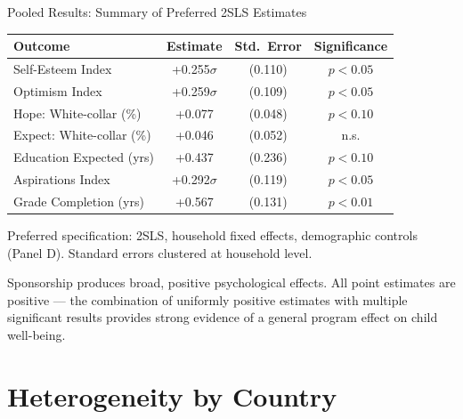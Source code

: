 \documentclass[aspectratio=169, 10pt]{beamer}
\begin{document}
\begin{frame}{Pooled Results: Summary of Preferred 2SLS Estimates}
  \begin{center}
  \small
  \begin{tabular}{lccc}
    \toprule
    \textbf{Outcome} & \textbf{Estimate} & \textbf{Std.\ Error} & \textbf{Significance} \\
    \midrule
    Self-Esteem Index       & +0.255$\sigma$ & (0.110) & $p < 0.05$ \\
    Optimism Index          & +0.259$\sigma$ & (0.109) & $p < 0.05$ \\
    Hope: White-collar (\%) & +0.077         & (0.048) & $p < 0.10$ \\
    Expect: White-collar (\%)& +0.046        & (0.052) & n.s. \\
    Education Expected (yrs) & +0.437        & (0.236) & $p < 0.10$ \\
    Aspirations Index       & +0.292$\sigma$ & (0.119) & $p < 0.05$ \\
    \midrule
    Grade Completion (yrs)  & +0.567         & (0.131) & $p < 0.01$ \\
    \bottomrule
  \end{tabular}
  \end{center}
  \vspace{0.2em}
  {\small \color{medgray} Preferred specification: 2SLS, household fixed effects, demographic controls (Panel D). Standard errors clustered at household level.}
  \vspace{0.3em}
  \begin{keybox}
    \small Sponsorship produces broad, positive psychological effects. All point estimates are positive --- the combination of uniformly positive estimates with multiple significant results provides strong evidence of a general program effect on child well-being.
  \end{keybox}
\end{frame}

\section{Heterogeneity by Country}
\end{document}
